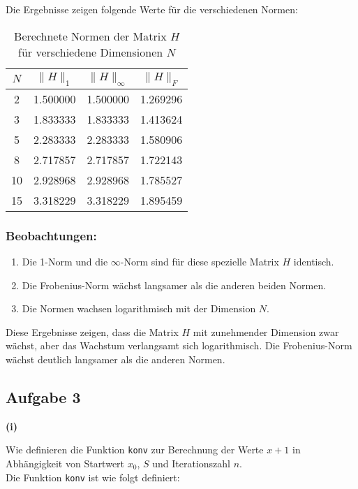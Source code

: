 \documentclass{article}
\begin{document}
Die Ergebnisse zeigen folgende Werte für die verschiedenen Normen:

\begin{table}[h]
\centering
\begin{tabular}{|c|c|c|c|}
\hline
$N$ & $\|H\|_1$ & $\|H\|_\infty$ & $\|H\|_F$ \\
\hline
2 & 1.500000 & 1.500000 & 1.269296 \\
3 & 1.833333 & 1.833333 & 1.413624 \\
5 & 2.283333 & 2.283333 & 1.580906 \\
8 & 2.717857 & 2.717857 & 1.722143 \\
10 & 2.928968 & 2.928968 & 1.785527 \\
15 & 3.318229 & 3.318229 & 1.895459 \\
\hline
\end{tabular}
\caption{Berechnete Normen der Matrix $H$ für verschiedene Dimensionen $N$}
\label{tab:operator_norms}
\end{table}

\subsubsection*{Beobachtungen:}

\begin{enumerate}
    \item Die 1-Norm und die $\infty$-Norm sind für diese spezielle Matrix $H$ identisch.
    
    \item Die Frobenius-Norm wächst langsamer als die anderen beiden Normen.
    
    \item Die Normen wachsen logarithmisch mit der Dimension $N$.
\end{enumerate}

Diese Ergebnisse zeigen, dass die Matrix $H$ mit zunehmender Dimension zwar wächst, aber das Wachstum verlangsamt sich logarithmisch. Die Frobenius-Norm wächst deutlich langsamer als die anderen Normen.    
    

\clearpage
\subsection*{Aufgabe 3}

\textbf{(i)}

Wie definieren die Funktion \texttt{konv} zur Berechnung der Werte $x + 1$ in Abhängigkeit von Startwert $x_0$, $S$ und Iterationszahl $n$.\\
Die Funktion \texttt{konv} ist wie folgt definiert:
\end{document}
